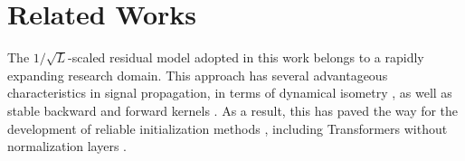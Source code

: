 \documentclass{article} %
\begin{document}







\section{Related Works}
\label{sec:related_works}

The $1/\sqrt{L}$-scaled residual model \citep{he2016deep} adopted in this work belongs to a rapidly expanding research domain. 
% 
This approach has several advantageous characteristics in signal propagation, in terms of dynamical isometry \citep{tarnowski2019dynamical}, as well as stable backward and forward kernels \citep{ balduzzi2017shattered, hayou2021stable, fischer2023optimal}. 
% 
As a result, this has paved the way for the development of reliable initialization methods \citep{taki2017deep, zhang2019fixup}, including Transformers without normalization layers \citep{huang2020improving, noci2022signal}. 
\end{document}
